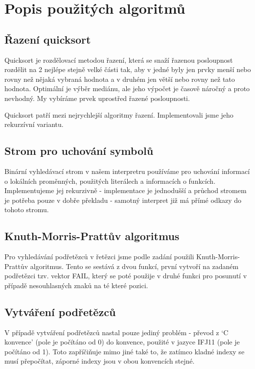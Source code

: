 \documentclass[a4paper,11pt,titlepage]{article}
\begin{document}
\section{Popis použitých algoritmů}

\subsection{Řazení quicksort}

Quicksort je rozdělovací metodou řazení, která se snaží řazenou posloupnost rozdělit na 2 nejlépe stejně velké části tak, aby v jedné byly jen prvky menší nebo rovny než nějaká vybraná hodnota a v druhém jen větší nebo rovny než tato hodnota. Optimální je výběr mediánu, ale jeho výpočet je časově náročný a proto nevhodný. My vybíráme prvek uprostřed řazené posloupnosti. 

Quicksort patří mezi nejrychlejší algoritmy řazení. Implementovali jsme jeho rekurzívní variantu.

\subsection{Strom pro uchování symbolů}

Binární vyhledávací strom v našem interpretru používáme pro u\-cho\-vá\-ní informací o lokálních proměnných, použitých literálech a informacích o funk\-cích. Implementujeme jej rekurzivně - implementace je jednodušší a průchod stromem je potřeba pouze v dobře překladu - samotný interpret již má přímé odkazy do tohoto stromu.

\subsection{Knuth-Morris-Prattův algoritmus}

Pro vyhledávání podřetězců v řetězci jsme podle zadání použili Knuth-Morris-Prattův algoritmus. Tento se sestává z dvou funkcí, první vytvoří na zadaném podřetězci tzv. vektor FAIL, který se poté použije v druhé funkci pro posunutí v případě nesouhlasných znaků na té které pozici.

\subsection{Vytváření podřetězců}

V případě vytváření podřetězců nastal pouze jediný problém - převod z `C konvence' (pole je počítáno od 0) do konvence, použité v jazyce IFJ11 (pole je počítáno od 1). Toto zapříčiňuje mimo jiné také to, že zatímco kladné indexy se musí přepočítat, záporné indexy jsou v obou konvencích stejné.
\end{document}
